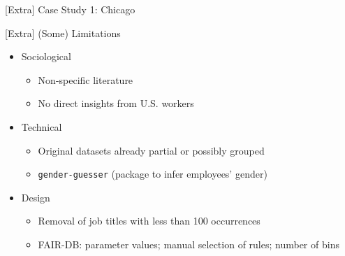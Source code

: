 \documentclass[usenames,dvipsnames]{beamer}
\begin{document}
    
    \begin{frame}[noframenumbering]{[Extra] Case Study 1: Chicago}
        \begin{figure}
            \medskip\centering
            \hfill
        \end{figure}
    \end{frame}
    
    
    \begin{frame}[noframenumbering]{[Extra] (Some) Limitations}
        \begin{itemize}
            \item Sociological
            \begin{itemize}
                \item Non-specific literature
                \item No direct insights from U.S. workers
            \end{itemize}
            \item Technical
            \begin{itemize}
                \item Original datasets already partial or possibly grouped
                \item \texttt{gender-guesser} (package to infer employees' gender)
            \end{itemize}
            \item Design
            \begin{itemize}
                \item Removal of job titles with less than 100 occurrences
                \item FAIR-DB: parameter values; manual selection of rules; number of bins
            \end{itemize}
        \end{itemize}
    \end{frame}
\end{document}
